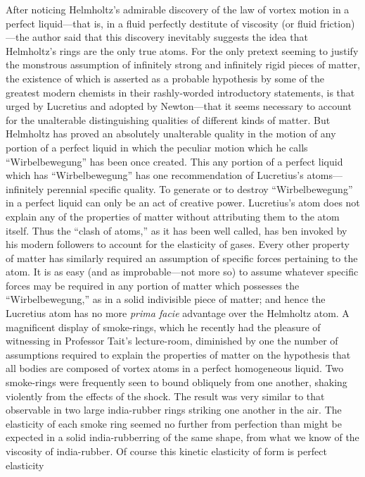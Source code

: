 After noticing Helmholtz's admirable discovery of the law of vortex motion in a
perfect liquid---that is, in a fluid perfectly destitute of viscosity (or fluid
friction)---the author said that this discovery inevitably suggests the idea
that Helmholtz's rings are the only true atoms. For the only pretext seeming to
justify the monstrous assumption of infinitely strong and infinitely rigid
pieces of matter, the existence of which is asserted as a probable hypothesis
by some of the greatest modern chemists in their rashly-worded introductory
statements, is that urged by Lucretius and adopted by Newton---that it seems
necessary to account for the unalterable distinguishing qualities of different
kinds of matter. But Helmholtz has proved an absolutely unalterable quality in
the motion of any portion of a perfect liquid in which the peculiar motion
which he calls ``Wirbelbewegung'' has been once created. This any portion of a
perfect liquid which has ``Wirbelbewegung'' has one recommendation of
Lucretius's atoms---infinitely perennial specific quality. To generate or to
destroy ``Wirbelbewegung'' in a perfect liquid can only be an act of creative
power. Lucretius's atom does not explain any of the properties of matter
without attributing them to the atom itself. Thus the ``clash of atoms,'' as it
has been well called, has ben invoked by his modern followers to account for
the elasticity of gases. Every other property of matter has similarly required
an assumption of specific forces pertaining to the atom. It is as easy (and as
improbable---not more so) to assume whatever specific forces may be required in
any portion of matter which possesses the ``Wirbelbewegung,'' as in a solid
indivisible piece of matter; and hence the Lucretius atom has no more {\it
prima facie\/} advantage over the Helmholtz atom. A magnificent display of
smoke-rings, which he recently had the pleasure of witnessing in Professor
Tait's lecture-room, diminished by one the number of assumptions required to
explain the properties of matter on the hypothesis that all bodies are composed
of vortex atoms in a perfect homogeneous liquid. Two smoke-rings were
frequently seen to bound obliquely from one another, shaking violently from the
effects of the shock. The result was very similar to that observable in two
large india-rubber rings striking one another in the air. The elasticity of
each smoke ring seemed no further from perfection than might be expected in a
solid india-rubberring of the same shape, from what we know of the viscosity of
india-rubber. Of course this kinetic elasticity of form is perfect elasticity
